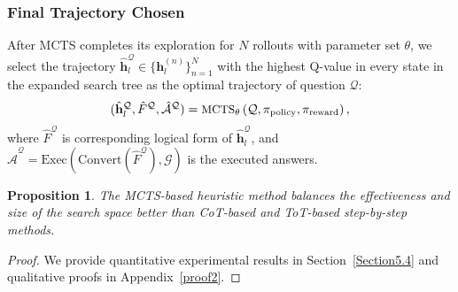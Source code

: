 \documentclass{article}
\theoremstyle{plain}
\newtheorem{proposition}[theorem]{Proposition}
\theoremstyle{definition}
\theoremstyle{remark}
\begin{document}
\subsubsection{Final Trajectory Chosen}
After MCTS completes its exploration for $N$ rollouts with parameter set $\theta$, we select the trajectory $\hat{\mathbf{h}}_l^{\mathcal{Q}}\in\{\mathbf{h}^{(n)}_l\}_{n=1}^N$ with the highest Q-value in every state in the expanded search tree as the optimal trajectory of question $\mathcal{Q}$:
\begin{equation}
\small
(\hat{\mathbf{h}}_l^{\mathcal{Q}},\hat{F}^{\mathcal{Q}},\hat{\mathcal{A}}^{\mathcal{Q}})=\text{MCTS}_{\theta}\left(\mathcal{Q},\pi_{\text{policy}},\pi_{\text{reward}}\right),
\end{equation}
where $\hat{F}^{\mathcal{Q}}$ is corresponding logical form of $\hat{\mathbf{h}}_l^{\mathcal{Q}}$, and $\hat{\mathcal{A}}^{\mathcal{Q}}=\text{Exec}(\text{Convert}(\hat{F}^{\mathcal{Q}}),\mathcal{G})$ is the executed answers.

\begin{proposition}
The MCTS-based heuristic method balances the effectiveness and size of the search space better than CoT-based and ToT-based step-by-step methods.
\end{proposition}
\begin{proof} 
We provide quantitative experimental results in Section~\ref{Section5.4} and qualitative proofs in Appendix~\ref{proof2}.
\end{proof}
\end{document}
